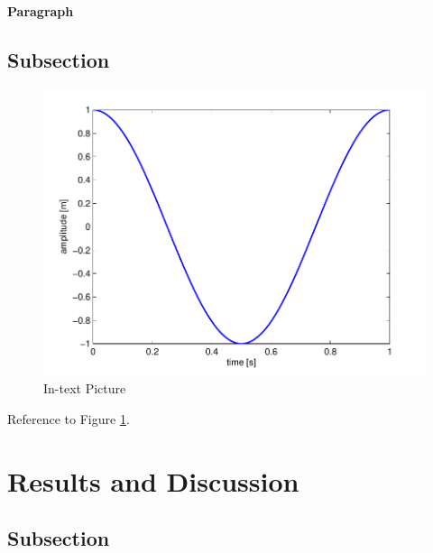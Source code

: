 \documentclass[fleqn,10pt]{SelfArx}\usepackage[]{graphicx}\usepackage[]{color}
\begin{document}
\paragraph{Paragraph} \lipsum[1] %

\subsection{Subsection}
\lipsum[1] %

\begin{figure}[ht]\centering
\includegraphics[width=\linewidth]{results}
\caption{In-text Picture}
\label{fig:results}
\end{figure}

Reference to Figure \ref{fig:results}.


\section{Results and Discussion}

\lipsum[1] %

\subsection{Subsection}
\end{document}
